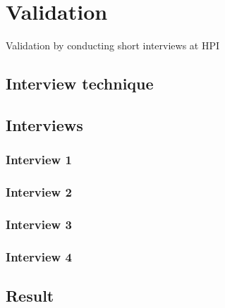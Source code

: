 \chapter{Validation}\label{ch:validation} %
Validation by conducting short interviews at HPI

\section{Interview technique}

\section{Interviews}
\subsection{Interview 1}
\subsection{Interview 2}
\subsection{Interview 3}
\subsection{Interview 4}

\section{Result}